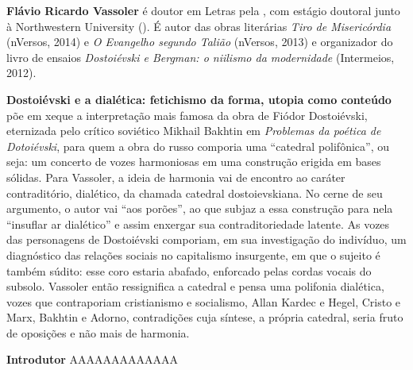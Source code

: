 
\textbf{Flávio Ricardo Vassoler} é doutor em Letras pela , com estágio doutoral junto à
  Northwestern University (). É autor das obras literárias \emph{Tiro
  de Misericórdia} (nVersos, 2014) e \emph{O Evangelho segundo Talião}
  (nVersos, 2013) e organizador do livro de ensaios \emph{Dostoiévski e
  Bergman: o niilismo da modernidade} (Intermeios, 2012).

\textbf{Dostoiévski e a dialética: fetichismo da forma, utopia como conteúdo} põe em xeque a interpretação mais famosa da obra de Fiódor Dostoiévski, eternizada pelo crítico soviético Mikhail Bakhtin em \emph{Problemas da poética de Dotoiévski}, para quem a obra do russo comporia uma ``catedral polifônica'', ou seja: um concerto de vozes harmoniosas em uma construção erigida em bases sólidas. Para Vassoler, a ideia de harmonia vai de encontro ao caráter contraditório, dialético, da chamada catedral dostoievskiana. No cerne de seu argumento, o autor vai “aos porões”, ao que subjaz a essa construção para nela “insuflar ar dialético” e assim enxergar sua contraditoriedade latente. As vozes das personagens de Dostoiévski comporiam, em sua investigação do indivíduo, um diagnóstico das relações sociais no capitalismo insurgente, em que o sujeito é também súdito: esse coro estaria abafado, enforcado pelas cordas vocais do subsolo. Vassoler então ressignifica a catedral e pensa uma polifonia dialética, vozes que contraporiam cristianismo e socialismo, Allan Kardec e Hegel, Cristo e Marx, Bakhtin e Adorno, contradições cuja síntese, a própria catedral, seria fruto de oposições e não mais de harmonia.  

\textbf{Introdutor} AAAAAAAAAAAAA\par





